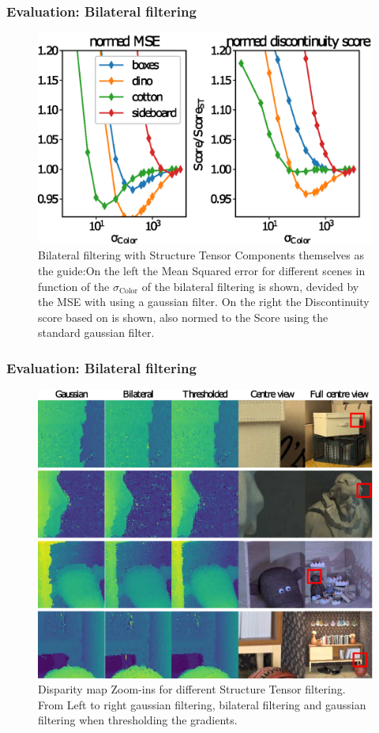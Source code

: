 \documentclass[11pt]{beamer}
\begin{document}
\begin{frame}
\frametitle{Evaluation: Bilateral filtering}
\begin{figure}
	\centering
	\includegraphics[width=0.7\linewidth]{images/bilateral_norm_params}
	\caption[Parameter dependency for bilateral filtering]{Bilateral filtering with Structure Tensor Components themselves as the guide:On the left the Mean Squared error for different scenes in function of the $\sigma_\text{Color}$ of the bilateral filtering is shown, devided by the MSE with using a gaussian filter. On the right the Discontinuity score based on \cite{honauer2016benchmark} is shown, also normed to the Score using the standard gaussian filter.}
	\label{fig:bilateralnormparams}
\end{figure}
\end{frame}

\begin{frame}
\frametitle{Evaluation: Bilateral filtering}
\begin{figure}
\centering
\includegraphics[width=0.9\linewidth]{images/thresh_results}
\caption[Disparity map Zoom-ins for different methods]{Disparity map Zoom-ins for different Structure Tensor filtering. From Left to right gaussian filtering, bilateral filtering and gaussian filtering when thresholding the gradients.}
\label{fig:threshresults}
\end{figure}
\end{frame}
\end{document}
